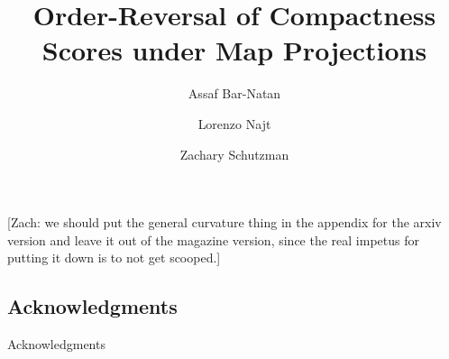 \documentclass{article}
\title{Order-Reversal of Compactness Scores under Map Projections}
\author{Assaf Bar-Natan \and Lorenzo Najt \and Zachary Schutzman }
\theoremstyle{definition}
\theoremstyle{remark}
\newif \ifdraft \drafttrue
\newcommand{\zs}[1]{\ifdraft \textcolor{RedViolet}{[Zach: #1]} \fi}
\begin{document}
\maketitle
\begin{abstract}

\end{abstract}
\ifarxiv
\else
\fi

\zs{we should put the general curvature thing in the appendix for the arxiv version and leave it out of the magazine version, since the real impetus for putting it down is to not get scooped.}







%







\ifarxiv
\subsection*{Acknowledgments}


\else

\begin{acknowledgment}{Acknowledgments}

\end{acknowledgment}
\fi




\pagebreak
\appendix


\end{document}
